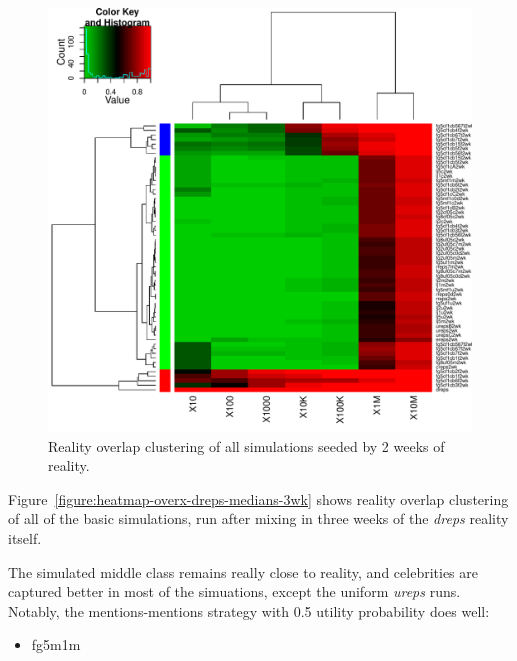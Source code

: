 \documentclass[10pt,oneside]{memoir}
\begin{document}
\begin{figure}
\begin{center}
    \includegraphics{figures/heatmap-overx-dreps-medians-2wk}
    \caption{Reality overlap clustering of all simulations seeded by 2 weeks of reality.}
    \label{figure:heatmap-overx-dreps-medians-2wk}
\end{center}
\end{figure}
Figure~\ref{figure:heatmap-overx-dreps-medians-3wk} shows reality overlap clustering of all of the basic simulations, run after mixing in three weeks of the {\itshape dreps} reality itself.


The simulated middle class remains really close to reality, and celebrities are captured better in most of the simuations, except the uniform {\itshape ureps} runs.
Notably, the mentions-mentions strategy with 0.5 utility probability does well:


\begin{itemize}


\item fg5m1m
\end{itemize}
\end{document}
